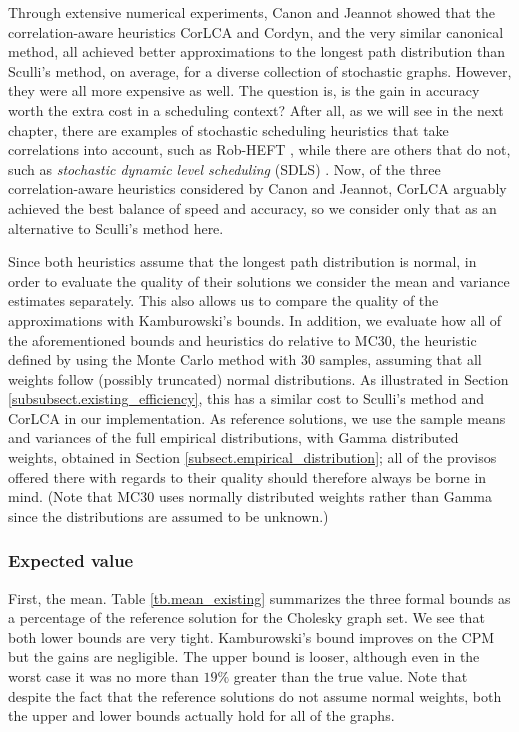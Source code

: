 \documentclass[12pt]{article}
\begin{document}
Through extensive numerical experiments, Canon and Jeannot showed that the correlation-aware heuristics CorLCA and Cordyn, and the very similar canonical method, all achieved better approximations to the longest path distribution than Sculli's method, on average, for a diverse collection of stochastic graphs. However, they were all more expensive as well. The question is, is the gain in accuracy worth the extra cost in a scheduling context? After all, as we will see in the next chapter, there are examples of stochastic scheduling heuristics that take correlations into account, such as Rob-HEFT \cite{can10}, while there are others that do not, such as {\em stochastic dynamic level scheduling} (SDLS) \cite{li15}. Now, of the three correlation-aware heuristics considered by Canon and Jeannot, CorLCA arguably achieved the best balance of speed and accuracy, so we consider only that as an alternative to Sculli's method here.

Since both heuristics assume that the longest path distribution is normal, in order to evaluate the quality of their solutions we consider the mean and variance estimates separately. This also allows us to compare the quality of the approximations with Kamburowski's bounds. In addition, we evaluate how all of the aforementioned bounds and heuristics do relative to MC30, the heuristic defined by using the Monte Carlo method with $30$ samples, assuming that all weights follow (possibly truncated) normal distributions. As illustrated in Section \ref{subsubsect.existing_efficiency}, this has a similar cost to Sculli's method and CorLCA in our implementation. As reference solutions, we use the sample means and variances of the full empirical distributions, with Gamma distributed weights, obtained in Section \ref{subsect.empirical_distribution}; all of the provisos offered there with regards to their quality should therefore always be borne in mind. (Note that MC30 uses normally distributed weights rather than Gamma since the distributions are assumed to be unknown.)

\subsubsection{Expected value}
\label{subsubsect.existing_mean}

First, the mean. Table \ref{tb.mean_existing} summarizes the three formal bounds as a percentage of the reference solution for the Cholesky graph set. We see that both lower bounds are very tight. Kamburowski's bound improves on the CPM but the gains are negligible. The upper bound is looser, although even in the worst case it was no more than $19\%$ greater than the true value. Note that despite the fact that the reference solutions do not assume normal weights, both the upper and lower bounds actually hold for all of the graphs.
\end{document}
